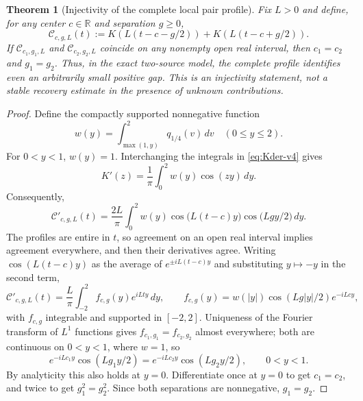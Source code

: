 \documentclass[11pt,a4paper]{article}
\numberwithin{equation}{section}
\newtheorem{theorem}{Theorem}[section]
\theoremstyle{definition}
\theoremstyle{remark}
\begin{document}
\begin{theorem}[Injectivity of the complete local pair profile]
\label{thm:pair-injective-v4}
Fix $L>0$ and define, for any center $c\in\mathbb R$ and
separation $g\ge0$,
\begin{equation}\label{eq:pair-complete-v4}
 \mathcal C_{c,g,L}(t):=
 K\!\left(L(t-c-g/2)\right)+
 K\!\left(L(t-c+g/2)\right).
\end{equation}
If $\mathcal C_{c_1,g_1,L}$ and $\mathcal C_{c_2,g_2,L}$ coincide on
any nonempty open real interval, then $c_1=c_2$ and $g_1=g_2$.
Thus, in the exact two-source model, the \emph{complete profile}
identifies even an arbitrarily small positive gap. This is an
injectivity statement, not a stable recovery estimate in the
presence of unknown contributions.
\end{theorem}
\begin{proof}
Define the compactly supported nonnegative function
\begin{equation}
 w(y)=\int_{\max(1,y)}^2q_{1/4}(v)\,dv
 \quad(0\le y\le2).
\end{equation}
For $0<y<1$, $w(y)=1$. Interchanging the integrals in
\eqref{eq:Kder-v4} gives
\begin{equation}
 K'(z)=\frac1\pi\int_0^2w(y)\cos(zy)\,dy.
\end{equation}
Consequently,
\begin{equation}\label{eq:pair-transform-v4}
 \mathcal C'_{c,g,L}(t)=\frac{2L}{\pi}
 \int_0^2w(y)\cos\bigl(L(t-c)y\bigr)
 \cos\bigl(Lgy/2\bigr)\,dy.
\end{equation}
The profiles are entire in $t$, so agreement on an open real
interval implies agreement everywhere, and then their derivatives agree.
Writing $\cos(L(t-c)y)$ as the average of $e^{\pm iL(t-c)y}$ and
substituting $y\mapsto-y$ in the second term,
\begin{equation}
 \mathcal C'_{c,g,L}(t)=\frac L\pi\int_{-2}^2f_{c,g}(y)e^{iLty}\,dy,
 \qquad f_{c,g}(y)=w(|y|)\cos(Lg|y|/2)e^{-iLcy},
\end{equation}
with $f_{c,g}$ integrable and supported in $[-2,2]$. Uniqueness of the
Fourier transform of $L^1$ functions gives $f_{c_1,g_1}=f_{c_2,g_2}$
almost everywhere; both are continuous on $0<y<1$, where $w=1$, so
\begin{equation}
 e^{-iLc_1y}\cos(Lg_1y/2)
 =e^{-iLc_2y}\cos(Lg_2y/2),\qquad 0<y<1.
\end{equation}
By analyticity this also holds at $y=0$. Differentiate once at
$y=0$ to get $c_1=c_2$, and twice to get $g_1^2=g_2^2$.
Since both separations are nonnegative, $g_1=g_2$.
\end{proof}
\end{document}
